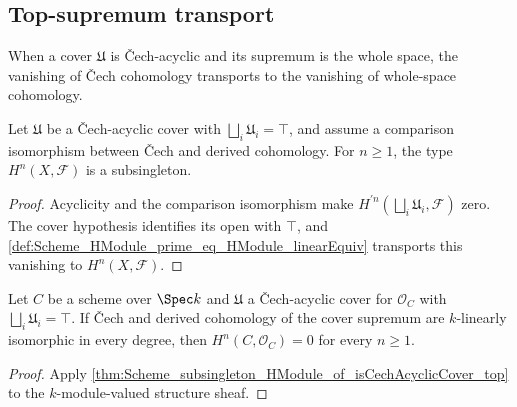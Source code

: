 \subsection{Top-supremum transport}

When a cover \(\mathfrak U\) is Čech-acyclic and its supremum is the whole space, the vanishing of Čech cohomology transports to the vanishing of whole-space cohomology.

\begin{theorem}\leanok
  \label{thm:Scheme_subsingleton_HModule_of_isCechAcyclicCover_top}

  Let \(\mathfrak U\) be a Čech-acyclic cover with \(\bigsqcup_i \mathfrak U_i = \top\), and assume a comparison isomorphism between Čech and derived cohomology. For \(n \ge 1\), the type \(H^{n}(X, \mathcal F)\) is a subsingleton.
\end{theorem}

\begin{proof}


\leanok
  Acyclicity and the comparison isomorphism make \(H^{\prime n}(\bigsqcup_i\mathfrak U_i,\mathcal F)\) zero. The cover hypothesis identifies its open with \(\top\), and \cref{def:Scheme_HModule_prime_eq_HModule_linearEquiv} transports this vanishing to \(H^n(X,\mathcal F)\).
\end{proof}

\begin{theorem}\leanok
  \label{thm:Scheme_subsingleton_HModule_of_isCechAcyclicCover_top_curve}

  Let \(C\) be a scheme over \(\Spec k\) and \(\mathfrak U\) a \v{C}ech-acyclic cover for \(\mathcal O_C\) with \(\bigsqcup_i\mathfrak U_i=\top\). If \v{C}ech and derived cohomology of the cover supremum are \(k\)-linearly isomorphic in every degree, then \(H^n(C,\mathcal O_C)=0\) for every \(n\geq 1\).
\end{theorem}

\begin{proof}


\leanok
  Apply \cref{thm:Scheme_subsingleton_HModule_of_isCechAcyclicCover_top} to the \(k\)-module-valued structure sheaf.
\end{proof}

